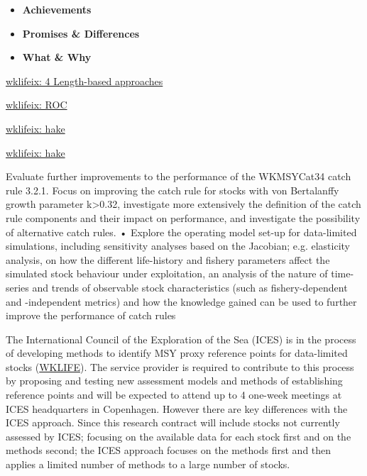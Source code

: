 \begin{itemize}[labelindent=\parindent,noitemsep,topsep=0pt,parsep=0pt,partopsep=0pt]
 \item \textbf{Achievements}
 \item \textbf{Promises \& Differences}
 \item \textbf{What \& Why}
\end{itemize}

\href{http://ices.dk/sites/pub/Publication Reports/Expert Group Report/Fisheries Resources Steering Group/2019/WKLIFEIX/WKLIFE_IX_2019.pdf#page=30}{wklifeix: 4 Length-based approaches}

\href{http://ices.dk/sites/pub/Publication Reports/Expert Group Report/Fisheries Resources Steering Group/2019/WKLIFEIX/WKLIFE_IX_2019.pdf#page=58)}{wklifeix: ROC}

\href{http://ices.dk/sites/pub/Publication Reports/Expert Group Report/Fisheries Resources Steering Group/2019/WKLIFEIX/WKLIFE_IX_2019.pdf#page=100}{wklifeix: hake}

\href{http://ices.dk/sites/pub/Publication Reports/Expert Group Report/Fisheries Resources Steering Group/2019/WKLIFEIX/WKLIFE_IX_2019.pdf#page=101}{wklifeix: hake}

Evaluate further improvements to the performance of the WKMSYCat34 catch rule 3.2.1.
Focus on improving the catch rule for stocks with von Bertalanffy growth parameter
k>0.32, investigate more extensively the definition of the catch rule components and their
impact on performance, and investigate the possibility of alternative catch rules.
• Explore the operating model set-up for data-limited simulations, including sensitivity
analyses based on the Jacobian; e.g. elasticity analysis, on how the different life-history
and fishery parameters affect the simulated stock behaviour under exploitation, an analysis of the nature of time-series and trends of observable stock characteristics (such as
fishery-dependent and -independent metrics) and how the knowledge gained can be
used to further improve the performance of catch rules

  \*\*The International Council of the Exploration of the Sea (ICES)\*\* is in the process of developing methods to identify MSY proxy reference points for data-limited stocks (\href{http://ices.dk/sites/pub/Publication Reports/Expert Group Report/Fisheries Resources Steering Group/2019/WKLIFEIX/WKLIFE_IX_2019.pdf}{WKLIFE}). The service provider is required to contribute to this process by proposing and testing new assessment models and methods of establishing reference points and will be expected to attend up to 4 one-week meetings at ICES headquarters in Copenhagen. However there are key differences with the ICES approach. Since this research contract will include stocks not currently assessed by ICES; focusing on the available data for each stock first and on the methods second; the ICES approach focuses on the methods first and then applies a limited number of methods to a large number of stocks.
